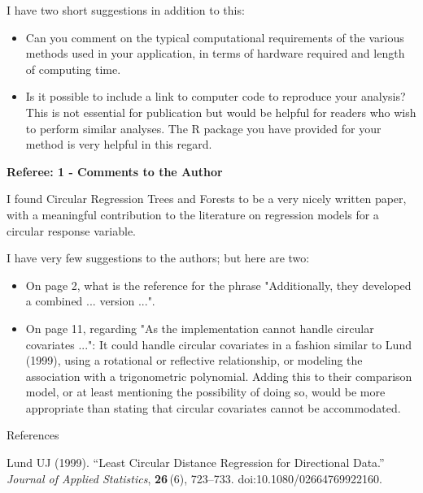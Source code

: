 \documentclass[english, noconfig]{uibklttr}
\newcommand{\section}[1]{{\Large{\textbf{#1}}}}
\begin{document}
I have two short suggestions in addition to this:

\begin{itemize}
\item Can you comment on the typical computational requirements of the various
methods used in your application, in terms of hardware required and length of
computing time.

\item Is it possible to include a link to computer code to reproduce your
analysis? This is not essential for publication but would be helpful for
readers who wish to perform similar analyses. The R package you have provided
for your method is very helpful in this regard.  
\end{itemize}

\newpage

\section{Referee: 1 - Comments to the Author}

I found Circular Regression Trees and Forests to be a very nicely written
paper, with a meaningful contribution to the literature on regression models
for a circular response variable. 

I have very few suggestions to the authors; but here are two:

\begin{itemize}
\item On page 2, what is the reference for the phrase "Additionally, they
developed a combined ... version ...".

\item On page 11, regarding "As the implementation cannot handle circular
covariates ...": It could handle circular covariates in a fashion similar to
Lund (1999), using a rotational or reflective relationship, or modeling the
association with a trigonometric polynomial. Adding this to their comparison
model, or at least mentioning the possibility of doing so, would be more
appropriate than stating that circular covariates cannot be accommodated.
\end{itemize}

\vspace{0.5cm}
References

Lund UJ (1999). ``Least Circular Distance Regression for Directional Data.''
\emph{Journal of Applied Statistics}, \textbf{26}\,(6), 723--733.
doi:10.1080/02664769922160.

\newpage
\end{document}
